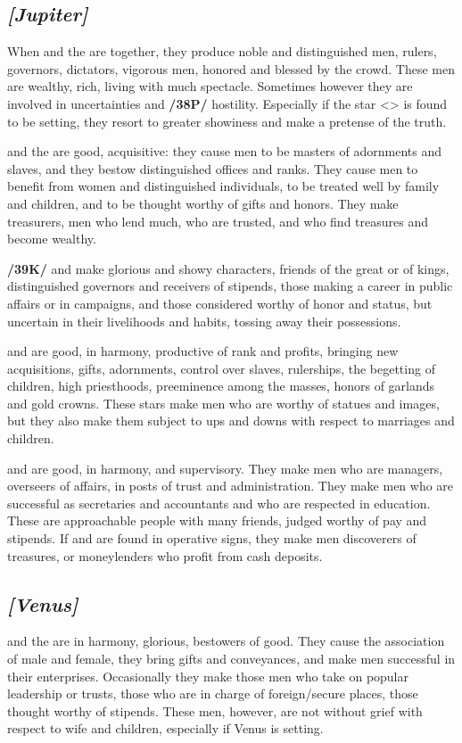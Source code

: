 \secbr
\subsection{\textit{[Jupiter]}}
When \Jupiter\xspace and the \Sun\xspace are together, they produce noble and distinguished men, rulers, governors,
dictators, vigorous men, honored and blessed by the crowd. These men are wealthy, rich, living with much spectacle. Sometimes however they are involved in uncertainties and \textbf{/38P/} hostility. Especially if the star <\Jupiter> is found to be setting, they resort to greater showiness and make a pretense of the truth.

\Jupiter\xspace and the \Moon\xspace are good, acquisitive: they cause men to be masters of adornments and slaves, and they bestow distinguished offices and ranks. They cause men to benefit from women and distinguished individuals, to be treated well by family and children, and to be thought worthy of gifts and honors. They make treasurers, men who lend much, who are trusted, and who find treasures and become wealthy.

\textbf{/39K/}\Jupiter\xspace and \Mars\xspace make glorious and showy characters, friends of the great or of kings,
distinguished governors and receivers of stipends, those making a career in public affairs or in campaigns, and those considered worthy of honor and status, but uncertain in their livelihoods and habits, tossing away their possessions.

\Jupiter\xspace and \Venus\xspace are good, in harmony, productive of rank and profits, bringing new acquisitions,
gifts, adornments, control over slaves, rulerships, the begetting of children, high priesthoods, preeminence among the masses, honors of garlands and gold crowns. These stars make men who are worthy of statues and images, but they also make them subject to ups and downs with respect to marriages and children.

\Jupiter\xspace and \Mercury\xspace are good, in harmony, and supervisory. They make men who are managers, overseers of affairs, in posts of trust and administration. They make men who are successful as secretaries and accountants and who are respected in education. These are approachable people with many friends, judged worthy of pay and stipends. If \Jupiter\xspace and \Mercury\xspace are found in operative signs, they make men
discoverers of treasures, or moneylenders who profit from cash deposits.

\secbr
\subsection{\textit{[Venus]}}
\Venus\xspace and the \Sun\xspace are in harmony, glorious, bestowers of good. They cause the association of male and female, they bring gifts and conveyances, and make men successful in their enterprises. Occasionally they make those men who take on popular leadership or trusts, those who are in charge of foreign/secure places, those thought worthy of stipends. These men, however, are not without grief with respect to wife and children, especially if Venus is setting.

